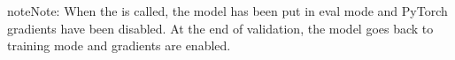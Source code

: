 \documentclass[letterpaper,10pt,english]{sphinxmanual}
\begin{document}
\begin{fulllineitems}
\begin{fulllineitems}
\begin{sphinxadmonition}{note}{Note:}
\sphinxAtStartPar
When the {\hyperref[\detokenize{pages/ml:vipercore.ml.plmodels.AutoEncoderModel.validation_step}]{}} is called, the model has been put in eval mode
and PyTorch gradients have been disabled. At the end of validation,
the model goes back to training mode and gradients are enabled.
\end{sphinxadmonition}

\end{fulllineitems}


\end{fulllineitems}

\end{document}
